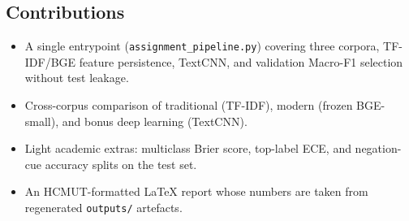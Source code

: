 \subsection{Contributions}

\begin{itemize}
  \item A single entrypoint (\texttt{assignment\_pipeline.py}) covering three corpora, TF-IDF/BGE feature persistence, TextCNN, and validation Macro-F1 selection without test leakage.
  \item Cross-corpus comparison of traditional (TF-IDF), modern (frozen BGE-small), and bonus deep learning (TextCNN).
  \item Light academic extras: multiclass Brier score, top-label ECE, and negation-cue accuracy splits on the test set.
  \item An HCMUT-formatted LaTeX report whose numbers are taken from regenerated \texttt{outputs/} artefacts.
\end{itemize}
